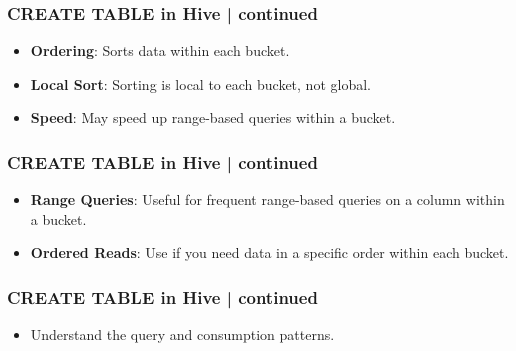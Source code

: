 \begin{frame}[fragile]
\frametitle{CREATE TABLE in Hive | continued}    
\vspace{-0.5cm}

\begin{tcolorbox}[colback=white,colframe=black,title= Part 6: Clustering and Sorting | Sort By: Key Points]
		\begin{itemize}
			\item \textbf{Ordering}: Sorts data within each bucket.
			\item \textbf{Local Sort}: Sorting is local to each bucket, not global.
			\item \textbf{Speed}: May speed up range-based queries within a bucket.
		\end{itemize}
\end{tcolorbox}
\end{frame}


\begin{frame}[fragile]
\frametitle{CREATE TABLE in Hive | continued}    
\vspace{-0.5cm}		
\begin{tcolorbox}[colback=white,colframe=black,title= Part 6: Clustering and Sorting | Sort By: When to Use]
		\begin{itemize}
			\item \textbf{Range Queries}: Useful for frequent range-based queries on a column within a bucket.
			\item \textbf{Ordered Reads}: Use if you need data in a specific order within each bucket.				  
		\end{itemize}
\end{tcolorbox}
\end{frame}


\begin{frame}[fragile]
\frametitle{CREATE TABLE in Hive | continued}    
\vspace{-0.5cm}		
\begin{tcolorbox}[colback=white,colframe=black,title= Part 6: Clustering and Sorting | Sort By: When to Use]
		\begin{itemize}
			\item Understand the query and consumption patterns.
		\end{itemize}
\end{tcolorbox}
\end{frame}

